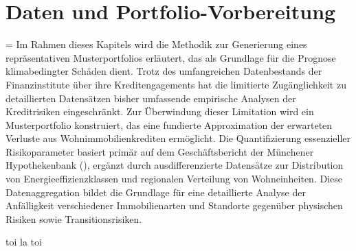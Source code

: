 \section{Daten und Portfolio-Vorbereitung}

\begin{sloppypar}
\emergencystretch=\hsize
Im Rahmen dieses Kapitels wird die Methodik zur Generierung eines repräsentativen Musterportfolios erläutert, das als Grundlage für die Prognose klimabedingter Schäden dient. Trotz des umfangreichen Datenbestands der Finanzinstitute über ihre Kredit\-engagements hat die limitierte Zugänglichkeit zu detaillierten Datensätzen bisher umfassende empirische Analysen der Kreditrisiken eingeschränkt. Zur Überwindung dieser Limitation wird ein Musterportfolio konstruiert, das eine fundierte Approximation der erwarteten Verluste aus Wohn\-immobilien\-krediten ermöglicht. Die Quantifizierung essenzieller Risikoparameter basiert primär auf dem Geschäftsbericht der Münchener Hypothekenbank (\cite{MuenchenerHyp2022}), ergänzt durch ausdifferenzierte Datensätze zur Distribution von Energie\-effizienz\-klassen und regionalen Verteilung von Wohneinheiten. Diese Datenaggregation bildet die Grundlage für eine detaillierte Analyse der Anfälligkeit verschiedener Immobilienarten und Standorte gegenüber physischen Risiken sowie Transitionsrisiken.
\end{sloppypar}
\newpage
toi la toi
